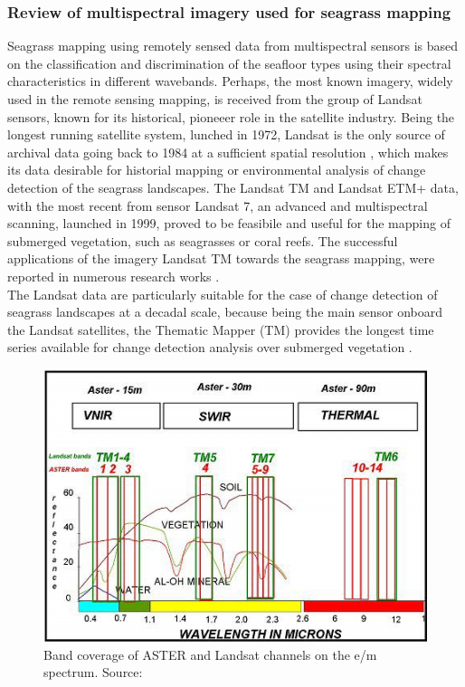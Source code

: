 \documentclass[10pt, a4paper]{article}
\begin{document}
\subsubsection{Review of multispectral imagery used for seagrass mapping}
Seagrass mapping using remotely sensed data from multispectral sensors is based on the classification
and discrimination of the seafloor types using their spectral characteristics in different wavebands.
Perhaps, the most known imagery, widely used in the remote sensing mapping, is received from the
group of Landsat sensors, known for its historical, pioneeer role in the satellite industry.
Being the longest running satellite system, lunched in 1972, Landsat is the only source of archival
data going back to 1984 at a sufficient spatial resolution \cite{Dekker05b}\label{Dekker05b}, which makes its data
desirable for historial mapping or environmental analysis of change detection of the seagrass
landscapes.
The Landsat TM and Landsat ETM+ data, with the most recent from sensor Landsat 7, an advanced
and multispectral scanning, launched in 1999, proved to be feasibile and useful for the mapping of
submerged vegetation, such as seagrasses or coral reefs. The successful applications of the imagery
Landsat TM towards the seagrass mapping, were reported in numerous research works \cite{Palandro03,Gullstroom06,Wabnitz08,Bierwirth93,Ferguson97,Rasib97}\label{Palandro03}\label{Gullstroom06}\label{Wabnitz08}\label{Bierwirth93}\label{Ferguson97}\label{Rasib97}.\\ The Landsat data are particularly suitable for the
case of change detection of seagrass landscapes at a decadal scale, because being the main sensor
onboard the Landsat satellites, the Thematic Mapper (TM) provides the longest time series
available for change detection analysis over submerged vegetation \cite{Palandro03}\label{Palandro03}.

\begin{figure}
	\centering
	\includegraphics[scale=0.35]{Fig-13.jpg}
 	\caption{Band coverage of ASTER and Landsat channels on the e/m spectrum. Source:\cite{Kalinowski04}\label{Kalinowski04}}
	\label{fig:2.4}
\end{figure}
\end{document}
